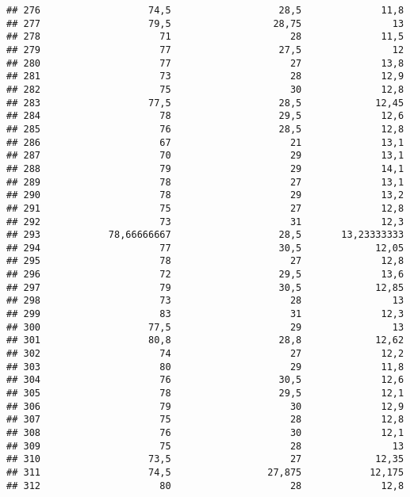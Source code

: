 \documentclass[
]{article}
\begin{document}
\begin{verbatim}
## 276                   74,5                   28,5              11,8
## 277                   79,5                  28,75                13
## 278                     71                     28              11,5
## 279                     77                   27,5                12
## 280                     77                     27              13,8
## 281                     73                     28              12,9
## 282                     75                     30              12,8
## 283                   77,5                   28,5             12,45
## 284                     78                   29,5              12,6
## 285                     76                   28,5              12,8
## 286                     67                     21              13,1
## 287                     70                     29              13,1
## 288                     79                     29              14,1
## 289                     78                     27              13,1
## 290                     78                     29              13,2
## 291                     75                     27              12,8
## 292                     73                     31              12,3
## 293            78,66666667                   28,5       13,23333333
## 294                     77                   30,5             12,05
## 295                     78                     27              12,8
## 296                     72                   29,5              13,6
## 297                     79                   30,5             12,85
## 298                     73                     28                13
## 299                     83                     31              12,3
## 300                   77,5                     29                13
## 301                   80,8                   28,8             12,62
## 302                     74                     27              12,2
## 303                     80                     29              11,8
## 304                     76                   30,5              12,6
## 305                     78                   29,5              12,1
## 306                     79                     30              12,9
## 307                     75                     28              12,8
## 308                     76                     30              12,1
## 309                     75                     28                13
## 310                   73,5                     27             12,35
## 311                   74,5                 27,875            12,175
## 312                     80                     28              12,8

\end{verbatim}
\end{document}
